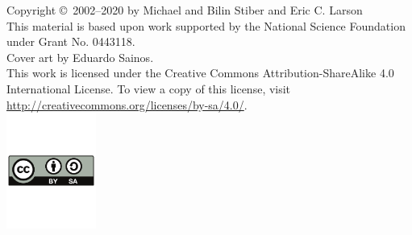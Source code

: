 \documentclass[12pt]{book}
\begin{document}
\begin{titlepage}
\newpage
\mbox{}\vspace{2in}
\begin{flushright}
Copyright \copyright\ 2002--2020 by Michael and Bilin Stiber and Eric
C. Larson\\[1in]
This material is based upon work supported by the National Science
Foundation under Grant No. 0443118.\\[1in]
Cover art by Eduardo Sainos.\\[1in]
This work is licensed under the Creative Commons
Attribution-ShareAlike 4.0 International License. To view a copy of
this license, visit
\url{http://creativecommons.org/licenses/by-sa/4.0/}.\\
\includegraphics[height=1.5in]{by-sa}
\end{flushright}

\thispagestyle{empty}

\end{titlepage}

\frontmatter

\tableofcontents
\listoffigures
\listoftables
\listofalgorithms
{}





\mainmatter











\appendix



\backmatter

\printindex
\end{document}
